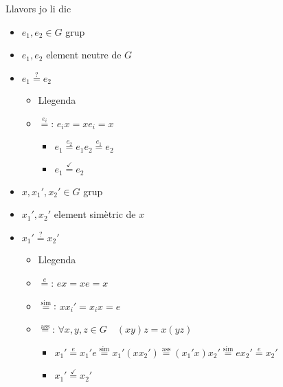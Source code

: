 \documentclass{article}
\begin{document}
Llavors jo li dic
\begin{itemize}
\item $e_1, e_2 \in G$ grup
\item $e_1, e_2$ element neutre de $G$
\item $e_1 \overset{?}{=} e_2$
	\begin{itemize}
	\item Llegenda
	\item $\overset{e_i}{=}$: $e_ix = xe_i = x$
		\begin{itemize}
		\item	$
			e_1 \overset{e_2}{=}
			e_1e_2 \overset{e_1}{=}
			e_2
			$
		\item $e_1 \overset{\checkmark}{=} e_2$
		\end{itemize}
	\end{itemize}
\item $x, x_1', x_2' \in G$ grup
\item $x_1', x_2'$ element simètric de $x$
\item $x_1' \overset{?}{=} x_2'$
	\begin{itemize}
	\item Llegenda
	\item $\overset{e}{=}$: $ex = xe = x$
	\item $\overset{\text{sim}}{=}$: $xx_i' = x_ix = e$
	\item $\overset{\text{ass}}{=}$: $\forall x,y,z \in G \quad (xy)z = x(yz)$
		\begin{itemize}
		\item	$
			x_1' \overset{e}{=}
			x_1'e \overset{\text{sim}}{=}
			x_1'(xx_2') \overset{\text{ass}}{=}
			(x_1'x)x_2' \overset{\text{sim}}{=}
			ex_2' \overset{e}{=}
			x_2'
			$
		\item $x_1' \overset{\checkmark}{=} x_2'$
		\end{itemize}
	\end{itemize}
\end{itemize}
\end{document}
